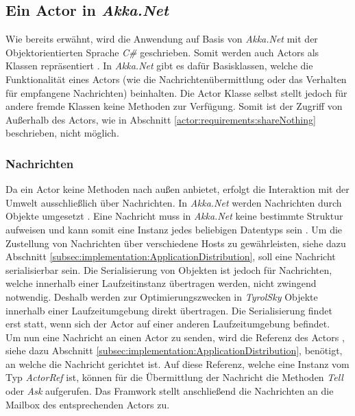 \subsection{Ein Actor in \textit{Akka.Net}}
Wie bereits erwähnt, wird die Anwendung auf Basis von \textit{Akka.Net} mit der Objektorientierten Sprache \textit{C\#} geschrieben. Somit werden auch Actors als Klassen repräsentiert \citep{Akka.netCommunityAkka.NETDocumentation}. In \textit{Akka.Net} gibt es dafür Basisklassen, welche die Funktionalität eines Actors (wie die Nachrichtenübermittlung oder das Verhalten für empfangene Nachrichten) beinhalten. Die Actor Klasse selbst stellt jedoch für andere fremde Klassen  keine Methoden zur Verfügung. Somit ist der Zugriff von Außerhalb des Actors, wie in Abschnitt \ref{actor:requirements:shareNothing} beschrieben, nicht möglich. 

\subsubsection{Nachrichten}\label{subsec:implementation:akkaMessaging}
Da ein Actor  keine Methoden nach außen anbietet, erfolgt die Interaktion mit der Umwelt ausschließlich über Nachrichten. In \textit{Akka.Net} werden Nachrichten durch Objekte umgesetzt \citep{akkaInAction}. Eine Nachricht  muss in \textit{Akka.Net} keine bestimmte Struktur aufweisen und kann somit eine Instanz jedes beliebigen Datentyps sein \citep{akkaInAction}. Um  die Zustellung von Nachrichten über verschiedene Hosts zu gewährleisten, siehe dazu Abschnitt \ref{subsec:implementation:ApplicationDistribution}, soll eine Nachricht serialisierbar sein. Die Serialisierung von Objekten ist jedoch für Nachrichten, welche innerhalb einer Laufzeitinstanz übertragen werden, nicht zwingend notwendig. Deshalb werden zur Optimierungszwecken in \textit{TyrolSky} Objekte innerhalb einer Laufzeitumgebung direkt übertragen. Die Serialisierung findet erst statt, wenn sich der Actor auf einer anderen Laufzeitumgebung befindet. \\
Um nun eine Nachricht an einen Actor zu senden, wird die Referenz des Actors , siehe dazu Abschnitt \ref{subsec:implementation:ApplicationDistribution}, benötigt, an welche die Nachricht gerichtet ist. Auf diese Referenz, welche eine Instanz vom Typ \textit{ActorRef} ist, können für die Übermittlung der Nachricht die Methoden \textit{Tell} oder \textit{Ask} aufgerufen. Das Framwork stellt anschließend die Nachrichten an die Mailbox des entsprechenden Actors zu.


